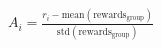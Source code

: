 \documentclass[preview]{standalone}
\begin{document}
\begin{align*}
A_i = \frac{r_i - \text{mean}\left(\text{rewards}_{\text{group}}\right)}{\text{std}\left(\text{rewards}_{\text{group}}\right)}
\end{align*}
\end{document}
